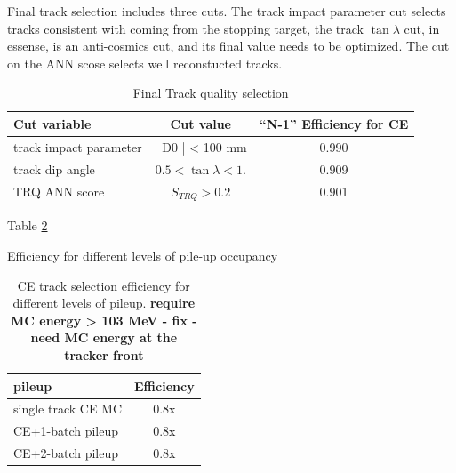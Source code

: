 Final track selection includes three cuts. The track impact parameter cut selects tracks consistent 
with coming from the stopping target, the track $\tan\lambda$ cut, in essense, is an anti-cosmics cut, and 
its final value needs to be optimized. The cut on the ANN scose selects well reconstucted tracks.

\begin{table}[h!]
  \begin{center}
    \caption{Final Track quality selection}
    \label{tab:table1}
    \begin{tabular}{l|c|c} %
      \textbf{Cut variable} & \textbf{Cut value} & \textbf{``N-1'' Efficiency for CE}\\
      \hline
      track impact parameter & | D0 | < 100 mm           &   0.990    \\
      track dip angle        & $ 0.5< \tan \lambda < 1.$ &   0.909    \\
      TRQ ANN score          & $S_{TRQ} > 0.2$            &   0.901    \\
    \end{tabular}
  \end{center}
\end{table}

Table \ref{table:ce_trq_efficiency_vs_pileup}

\begin{table}[h!]
  \begin{center}
    \caption{Efficiency for different levels of pile-up occupancy}
    \label{tab:table1}
    \begin{tabular}{l|c} %
      \textbf{pileup} &  \textbf{Efficiency}\\
      \hline
      single track CE MC      &   0.8x    \\
      CE+1-batch pileup       &   0.8x    \\
      CE+2-batch pileup       &   0.8x    \\
    \end{tabular}
  \end{center}
\caption{
  \label{table:ce_trq_efficiency_vs_pileup} 
  CE track selection efficiency for different levels of pileup. 
  {\color{red} \bf require MC energy > 103 MeV - fix - need MC energy at the tracker front}
}
\end{table}






